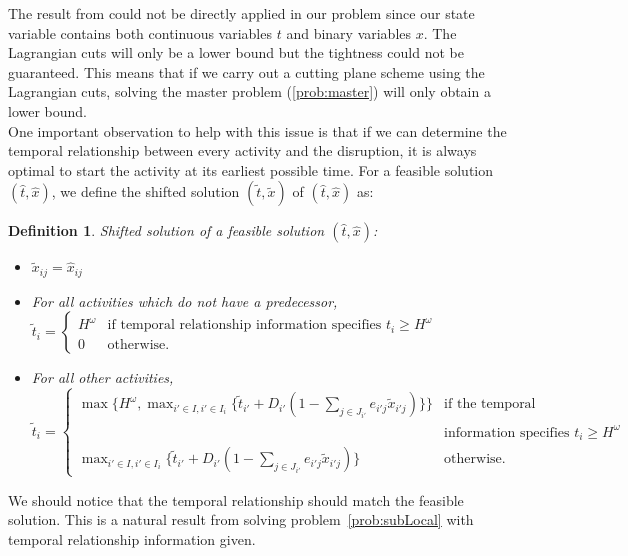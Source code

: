 \documentclass[11pt]{article}
\newtheorem{definition}{Definition}
\newcommand{\noi}{\noindent}
\begin{document}
	The result from \cite{zou2016nested} could not be directly applied in our problem since our state variable contains both continuous variables \(t\) and binary variables \(x\). The Lagrangian cuts will only be a lower bound but the tightness could not be guaranteed. This means that if we carry out a cutting plane scheme using the Lagrangian cuts, solving the master problem (\ref{prob:master}) will only obtain a lower bound. \\
	\newline
	One important observation to help with this issue is that if we can determine the temporal relationship between every activity and the disruption, it is always optimal to start the activity at its earliest possible time. For a feasible solution \((\hat{t},\hat{x})\), we define the shifted solution \((\tilde{t},\tilde{x})\) of \((\hat{t},\hat{x})\) as:
	\begin{definition}
		Shifted solution of a feasible solution \((\hat{t},\hat{x})\):
		\begin{itemize}
			\item \(\tilde{x}_{ij} = \hat{x}_{ij}\)
			\item For all activities which do not have a predecessor,\\
				\(\tilde{t}_i = 
				\begin{cases}
					H^\omega & \text{if temporal relationship information specifies } t_i \geq H^\omega\\
					0 & \text{otherwise.}
				\end{cases}
				\)
			\item For all other activities, \\
				\(\tilde{t}_i = 
				\begin{cases}
				\max \{H^\omega, \max_{i' \in I, i' \in I_i} \{\tilde{t}_{i'} + D_{i'}(1 - \sum_{j \in J_{i'}} e_{i'j}\tilde{x}_{i'j})\} \} & \text{if the temporal relationship}\\
				& \text{information specifies } t_i \geq H^\omega\\
				\max_{i' \in I, i' \in I_i} \{\tilde{t}_{i'} + D_{i'}(1 - \sum_{j \in J_{i'}} e_{i'j}\tilde{x}_{i'j})\} & \text{otherwise.}
				\end{cases}
				\)
		\end{itemize}
	\end{definition}
	\noi We should notice that the temporal relationship should match the feasible solution. This is a natural result from solving problem~\ref{prob:subLocal} with temporal relationship information given. \\
\end{document}

